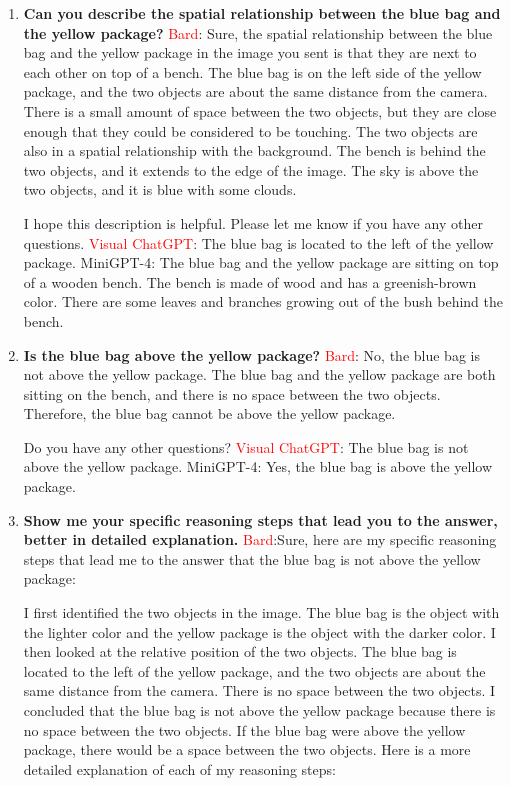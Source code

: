     \begin{enumerate}
        \item \textbf{Can you describe the spatial relationship between the blue bag and the yellow package?}
        \subitem \textcolor{Red}{Bard}: 
        Sure, the spatial relationship between the blue bag and the yellow package in the image you sent is that they are next to each other on top of a bench. The blue bag is on the left side of the yellow package, and the two objects are about the same distance from the camera. There is a small amount of space between the two objects, but they are close enough that they could be considered to be touching.
        The two objects are also in a spatial relationship with the background. The bench is behind the two objects, and it extends to the edge of the image. The sky is above the two objects, and it is blue with some clouds.

        I hope this description is helpful. Please let me know if you have any other questions.
        \subitem \textcolor{red}{Visual ChatGPT}: The blue bag is located to the left of the yellow package.
        \subitem MiniGPT-4: The blue bag and the yellow package are sitting on top of a wooden bench. The bench is made of wood and has a greenish-brown color. There are some leaves and branches growing out of the bush behind the bench.
        \item \textbf{Is the blue bag above the yellow package?}
        \subitem \textcolor{Red}{Bard}: 
        No, the blue bag is not above the yellow package. The blue bag and the yellow package are both sitting on the bench, and there is no space between the two objects. Therefore, the blue bag cannot be above the yellow package.

        Do you have any other questions?
        \subitem \textcolor{red}{Visual ChatGPT}: The blue bag is not above the yellow package.
        \subitem MiniGPT-4: Yes, the blue bag is above the yellow package.
        \item \textbf{Show me your specific reasoning steps that lead you to the answer, better in detailed explanation.}
        \subitem \textcolor{Red}{Bard}:Sure, here are my specific reasoning steps that lead me to the answer that the blue bag is not above the yellow package:

        I first identified the two objects in the image. The blue bag is the object with the lighter color and the yellow package is the object with the darker color.
        I then looked at the relative position of the two objects. The blue bag is located to the left of the yellow package, and the two objects are about the same distance from the camera. There is no space between the two objects.
        I concluded that the blue bag is not above the yellow package because there is no space between the two objects. If the blue bag were above the yellow package, there would be a space between the two objects.
        Here is a more detailed explanation of each of my reasoning steps:
        

\end{enumerate}

